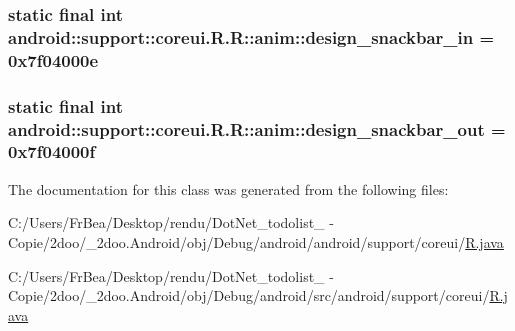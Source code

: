 \hypertarget{classandroid_1_1support_1_1coreui_1_1_r_1_1anim_5d5a3da042ea0f73c7ad25db8f18b002}{
\subsubsection[{design\_\-snackbar\_\-in}]{\setlength{\rightskip}{0pt plus 5cm}static final int android::support::coreui.R.R::anim::design\_\-snackbar\_\-in = 0x7f04000e}}
\label{classandroid_1_1support_1_1coreui_1_1_r_1_1anim_5d5a3da042ea0f73c7ad25db8f18b002}


\hypertarget{classandroid_1_1support_1_1coreui_1_1_r_1_1anim_8cca191dc6185f5e4ac60e63625995a6}{
\subsubsection[{design\_\-snackbar\_\-out}]{\setlength{\rightskip}{0pt plus 5cm}static final int android::support::coreui.R.R::anim::design\_\-snackbar\_\-out = 0x7f04000f}}
\label{classandroid_1_1support_1_1coreui_1_1_r_1_1anim_8cca191dc6185f5e4ac60e63625995a6}




The documentation for this class was generated from the following files:\begin{CompactItemize}
\item 
C:/Users/FrBea/Desktop/rendu/DotNet\_\-todolist\_ - Copie/2doo/\_\-2doo.Android/obj/Debug/android/android/support/coreui/\hyperlink{android_2support_2coreui_2_r_8java}{R.java}\item 
C:/Users/FrBea/Desktop/rendu/DotNet\_\-todolist\_ - Copie/2doo/\_\-2doo.Android/obj/Debug/android/src/android/support/coreui/\hyperlink{src_2android_2support_2coreui_2_r_8java}{R.java}\end{CompactItemize}

